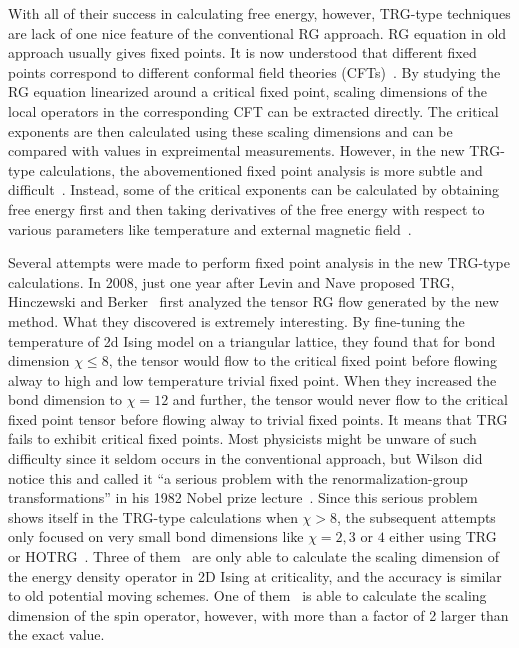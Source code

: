 \documentclass[aps,prb,reprint,superscriptaddress]{revtex4-2}
\begin{document}
With all of their success in calculating free energy, however, TRG-type
techniques are lack of one nice feature of the conventional RG approach.
RG equation in old approach usually gives fixed points. It is now
understood that different fixed points correspond to different conformal
field theories (CFTs)~\cite{polchinski1988,nakayama2015}. By studying
the RG equation linearized around a critical fixed point, scaling
dimensions of the local operators in the corresponding CFT can be
extracted directly. The critical exponents are then calculated using
these scaling dimensions and can be compared with values in expreimental
measurements. However, in the new TRG-type calculations, the
abovementioned fixed point analysis is more subtle and
difficult~\cite{kadanoff2014}.  Instead, some of the critical exponents
can be calculated by obtaining free energy first and then taking
derivatives of the free energy with respect to various parameters like
temperature and external magnetic field~\cite{hotrg,
Berker2008,xiang2019adtrg}. 
%

Several attempts were made to perform fixed point analysis in the new
TRG-type calculations. In 2008, just one year after Levin and Nave
proposed TRG, Hinczewski and Berker~\cite{Berker2008} first analyzed the
tensor RG flow generated by the new method. What they discovered is
extremely interesting.  By fine-tuning the temperature of 2d Ising model
on a triangular lattice, they found that for bond dimension $\chi \leq
8$, the tensor would flow to the critical fixed point before flowing
alway to high and low temperature trivial fixed point. When they
increased the bond dimension to $\chi =  12$ and further, the tensor
would never flow to the critical fixed point tensor before flowing alway
to trivial fixed points. It means that TRG fails to exhibit critical
fixed points. Most physicists might be unware of such difficulty since
it seldom occurs in the conventional approach, but Wilson did notice
this and called it ``a serious problem with the renormalization-group
transformations'' in his 1982 Nobel prize lecture~\cite{wilsonNobel}.
Since this serious problem shows itself in the TRG-type calculations
when $\chi > 8$, the subsequent attempts only focused on very small
bond dimensions like $\chi = 2, 3$ or $4$ either using
TRG~\cite{kadanoff2014,aoki2009} or HOTRG~\cite{meurice2013}. Three of
them~\cite{Berker2008,aoki2009,meurice2013} are only able to calculate
the scaling dimension of the energy density operator in 2D Ising at
criticality, and the accuracy is similar to old potential moving
schemes. One of them~\cite{kadanoff2014} is able to calculate the
scaling dimension of the spin operator, however, with more than a factor
of 2 larger than the exact value. 
%
\end{document}
